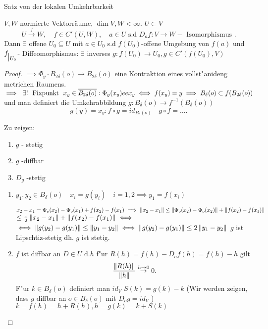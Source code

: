 \documentclass[class=article, crop=false]{standalone}
\begin{document}
\begin{zettel}{Satz von der lokalen Umkehrbarkeit}

\begin{flashcard}[]{}
	\begin{theorem}
		$V,W$ normierte Vektorräume, $\dim V,W < \infty$.  $U \subset V$
		\[
			U \stackrel{f}{\to} W,\quad f \in C'(U,W),\quad a \in U \text{ s.d } D_af: V \to W - \text{ Isomorphismus }
		.\]
		Dann $\exists $ offene $U_0 \subseteq U$ mit $a \in U_0$ s.d $f( U_0 ) $-offene Umgebung von $f( a ) $ und $f _{\big{|_{U_0}}} $- Diffeomorphismus: $\exists $ inverses $g : f( U_0 ) \to U_0, g \in C'(f(U_0),V) $
	\end{theorem}
\end{flashcard}

\begin{proof}
	$\implies \Phi_y \cdot  \bar{B_{2\delta}(o)} \to  \bar{B_{2\delta}(o)}$ eine Kontraktion eines vollst"anideng metrichen Raumens. $\implies  \exists ! \tx{ Fixpunkt } x_y \in \bar{B_{2\delta}(o)}: \Phi_y(x_y) ee x_y \iff  f(x_y)= y \implies  B_{\delta}(o) \subset  f (B_{2\delta}(o)) $ und man definiert die Umkehrabbildung $g: B_{\delta}(o) \to  f^{-1}(B_{\delta}(o))$
	\[
		g(y) = x_y: f \circ  g = id_{B_{\delta}(o)} \quad g \circ  f = \dots
	.\]

	Zu zeigen:
	\begin{enumerate}
		\item $g$ - stetig
		\item $g$ -diffbar
		\item $D_g$ -stetig
	\end{enumerate}

	\begin{enumerate}
		\item $y_1, y_2 \in  B_{\delta}(o) \quad x_i = g(y_i) \quad i =1,2 \implies y_1 = f(x_i)$

		      $x_2 - x_1 = \Phi_o(x_2) - \Phi_o(x_1) + f(x_2) - f(x_1) \implies \left\|x_2 - x_1\right\| \leq  \left\|\Phi_o(x_2) - \Phi_o(x_2)\right\| + \left\| f(x_2) - f(x_1)\right\|$ $\leq  \frac{1}{2} \left\|x_2-x_1\right\| + \left\| f(x_2) - f(x_1)\right\| \iff $
		      $\iff \left\|g(y_2) - g(y_1)\right\| \leq  \left\|y_1 - y_2\right\| \iff \left\|g(y_2) - g(y_1)\right\| \leq 2\left\|y_1-y_2\right\|$
		      $g$ ist Lipschtiz-stetig dh. $g$ ist stetig.

		\item $f$ ist diffbar an $D \in  U$ d.$h$ f"ur $R(h) = f(h) - D_o f(h) = f(h) - h$  gilt
		      \[
			      \frac{\left\|R(h)\right\|}{\left\|h\right\|} \stackrel{h \to  0}{\to} 0
		      .\]
		      F"ur $k \in  B_{\delta}(o)$ definiert man $id_V$ $S(k) = g(k) - k $
		      (Wir werden zeigen, dass $g$ diffbar an $o \in  B_{\delta}(o)$ mit $D_o g = id_V$ )\\
		      $k = f(h) = h + R(h), h = g(k) = k + S(k)$


\end{enumerate}
\end{proof}
\end{zettel}
\end{document}
